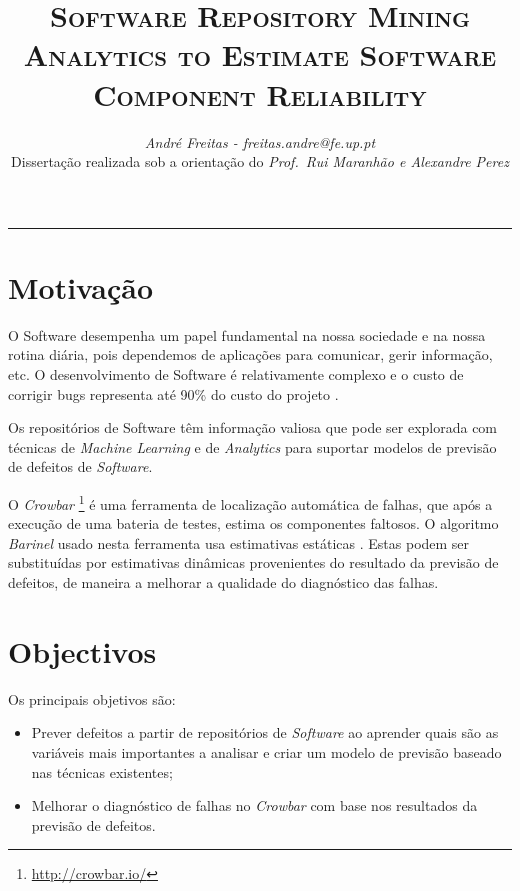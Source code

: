 \documentclass[9pt,a4paper]{extarticle}
\begin{document}
\title{\vspace*{-8mm}\textbf{\textsc{Software Repository Mining Analytics to Estimate Software Component Reliability}}}
\author{\emph{André Freitas - freitas.andre@fe.up.pt}\\[2mm]
\small{Dissertação realizada sob a orientação do \emph{Prof.\ Rui Maranhão e Alexandre Perez}}}
\date{}
\maketitle
\thispagestyle{empty}

\vspace*{-4mm}\noindent\rule{\textwidth}{0.4pt}\vspace*{4mm}

\begin{multicols}{2}

\section{Motivação}\label{sec:motiva}
O Software desempenha um papel fundamental na nossa sociedade e na nossa rotina
diária, pois dependemos de aplicações para comunicar, gerir informação, etc.
O desenvolvimento de Software é relativamente complexo e o custo de
corrigir bugs representa até 90\% do custo do projeto \cite{Servant1}.

Os repositórios de Software têm informação valiosa que pode ser explorada com
técnicas de \emph{Machine Learning} e de \emph{Analytics} para suportar modelos
de previsão de defeitos de \emph{Software}.

O \emph{Crowbar} \footnote{\url{http://crowbar.io/}} é uma ferramenta de localização
automática de falhas, que após a execução de uma bateria de testes, estima os
componentes faltosos. O algoritmo \emph{Barinel} usado nesta ferramenta usa estimativas
estáticas \cite{Abreu:2009:SMF:1747491.1747511}. Estas podem ser substituídas
por estimativas dinâmicas provenientes do resultado da previsão de defeitos, de
maneira a melhorar a qualidade do diagnóstico das falhas.


\section{Objectivos}\label{sec:goals}

Os principais objetivos são:

\begin{itemize}
\item Prever defeitos a partir de repositórios de \emph{Software} ao aprender quais
são as variáveis mais importantes a analisar e criar um modelo de previsão
baseado nas técnicas existentes;
\item Melhorar o diagnóstico de falhas no \emph{Crowbar} com base nos resultados
da previsão de defeitos.
\end{itemize}


\end{multicols}
\end{document}
